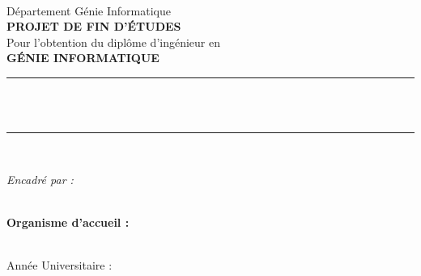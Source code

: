 \begin{titlepage}
    \centering
    \vspace*{1cm}
    
    
    {\LARGE \textbf{\university}}\\[0.5cm]
    {\large Département Génie Informatique}\\[2cm]
    
    {\Huge \textbf{PROJET DE FIN D'ÉTUDES}}\\[1cm]
    
    {\large Pour l'obtention du diplôme d'ingénieur en}\\[0.3cm]
    {\Large \textbf{GÉNIE INFORMATIQUE}}\\[2cm]
    
    \rule{\linewidth}{0.2mm} \\[0.4cm]
    {\huge \bfseries \projecttitle} \\[0.4cm]
    \rule{\linewidth}{0.2mm} \\[2cm]
    
    \begin{minipage}{0.4\textwidth}
    \end{minipage}
    \begin{minipage}{0.4\textwidth}
        \begin{flushright} \large
            \emph{Encadré par :}\\
            \textbf{\supervisor}
        \end{flushright}
    \end{minipage}\\[2cm]
    
    {\large \textbf{Organisme d'accueil :}}\\[0.3cm]
    {\Large \textbf{\organization}}\\[2cm]
    
    \vfill
    
    {\large Année Universitaire : \academicyear}
    
\end{titlepage}

\newpage
\thispagestyle{empty}
\mbox{}

